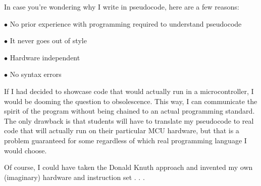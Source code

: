 \vskip 10pt

In case you're wondering why I write in pseudocode, here are a few reasons:

\medskip
\goodbreak
\item{$\bullet$} No prior experience with programming required to understand pseudocode
\item{$\bullet$} It never goes out of style
\item{$\bullet$} Hardware independent
\item{$\bullet$} No syntax errors
\medskip

If I had decided to showcase code that would actually run in a microcontroller, I would be dooming the question to obsolescence.  This way, I can communicate the spirit of the program without being chained to an actual programming standard.  The only drawback is that students will have to translate my pseudocode to real code that will actually run on their particular MCU hardware, but that is a problem guaranteed for some regardless of which real programming language I would choose.

Of course, I could have taken the Donald Knuth approach and invented my own (imaginary) hardware and instruction set . . . 




